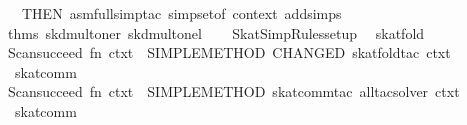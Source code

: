 \begin{isabellebody}
\ \ THEN\ asm{}full{}simp{}tac\ {}simpset{}of\ context\ addsimps\ %
\isaantiq
thms\ skd{}mult{}oner\ skd{}mult{}onel{}%
\endisaantiq
{}\ {}{}\isanewline
\isanewline
{}\isanewline
\isanewline
{}\isamarkupfalse%
\ {}\ SkatSimpRules{}setup\ {}\isanewline
\isanewline
{}\isamarkupfalse%
\ skat{}fold\ {}\ {}\isanewline
Scan{}succeed\ {}fn\ ctxt\ {}{}\ SIMPLE{}METHOD\ {}CHANGED\ {}skat{}fold{}tac\ ctxt\ {}{}{}{}\isanewline
{}\isanewline
\isanewline
{}\isamarkupfalse%
\ skat{}comm{}\ {}\ {}\isanewline
Scan{}succeed\ {}fn\ ctxt\ {}{}\ SIMPLE{}METHOD{}\ {}skat{}comm{}tac\ all{}tac{}solver\ ctxt{}{}\isanewline
{}\isanewline
\isanewline
{}\isamarkupfalse%
\ skat{}comm\ {}\ {}\isanewline

\end{isabellebody}
